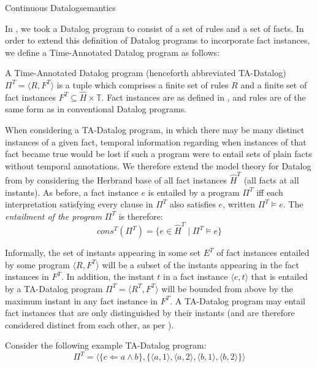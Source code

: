 \begin{nestedsection}{Continuous Datalog}{semantics}
\begin{definition}
\end{definition}

In , we took a Datalog
program to consist of a set of rules and a set of facts.  In order to
extend this definition of Datalog programs to incorporate fact
instances, we define a Time-Annotated Datalog program as follows:

\begin{definition}

A Time-Annotated Datalog program (henceforth abbreviated TA-Datalog)
$\Pi^T = \langle R, F^T\rangle$ is a tuple which comprises a finite
set of rules $R$ and a finite set of fact instances $F^T \subseteq
\hat{H} \times \mathbb{T}$. Fact instances are as defined in
, and rules are of the same
form as in conventional Datalog programs.

When considering a TA-Datalog program, in which there may be many
distinct instances of a given fact, temporal information regarding
when instances of that fact became true would be lost if such a
program were to entail sets of plain facts without temporal
annotations. We therefore extend the model theory for Datalog from
 by considering the
Herbrand base of all fact instances $\hat{H}^T$ (all facts at all
instants). As before, a fact instance $e$ is entailed by a program
$\Pi^T$ iff each interpretation satisfying every clause in $\Pi^T$
also satisfies $e$, written $\Pi^T \models e$. The {\em entailment of the
program} $\Pi^T$ is therefore:
\[ cons^T(\Pi^T) = \{ e \in \hat{H}^T \mid \Pi^T \models e \} \]

Informally, the set of instants appearing in some set $E^T$ of fact
instances entailed by some program ${\langle R, F^T \rangle}$ will be
a subset of the instants appearing in the fact instances in $F^T$.  In
addition, the instant $t$ in a fact instance $\langle e, t \rangle$
that is entailed by a TA-Datalog program $\Pi^T = \langle R^T, F^T
\rangle$ will be bounded from above by the maximum instant in any fact
instance in $F^T$. A TA-Datalog program may entail fact instances that
are only distinguished by their instants (and are therefore considered
distinct from each other, as per ).

Consider the following example TA-Datalog program:
\[
\Pi^T = \langle \{ c \Leftarrow a \land b \}, \{ \langle a, 1 \rangle, \langle a, 2 \rangle, \langle b, 1 \rangle, \langle b, 2 \rangle  \} \rangle
\]


\end{definition}
\end{nestedsection}
